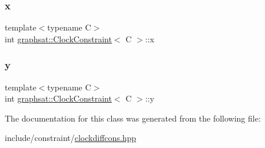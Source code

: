 \subsubsection{\texorpdfstring{x}{x}}
{\footnotesize\ttfamily template$<$typename C$>$ \\
int \mbox{\hyperlink{classgraphsat_1_1_clock_constraint}{graphsat\+::\+Clock\+Constraint}}$<$ C $>$\+::x}

\mbox{\label{classgraphsat_1_1_clock_constraint_aa3113fd47bd0291152a30708edd2acf5}} 
\subsubsection{\texorpdfstring{y}{y}}
{\footnotesize\ttfamily template$<$typename C$>$ \\
int \mbox{\hyperlink{classgraphsat_1_1_clock_constraint}{graphsat\+::\+Clock\+Constraint}}$<$ C $>$\+::y}



The documentation for this class was generated from the following file\+:\begin{DoxyCompactItemize}
\item 
include/constraint/\mbox{\hyperlink{clockdiffcons_8hpp}{clockdiffcons.\+hpp}}\end{DoxyCompactItemize}
